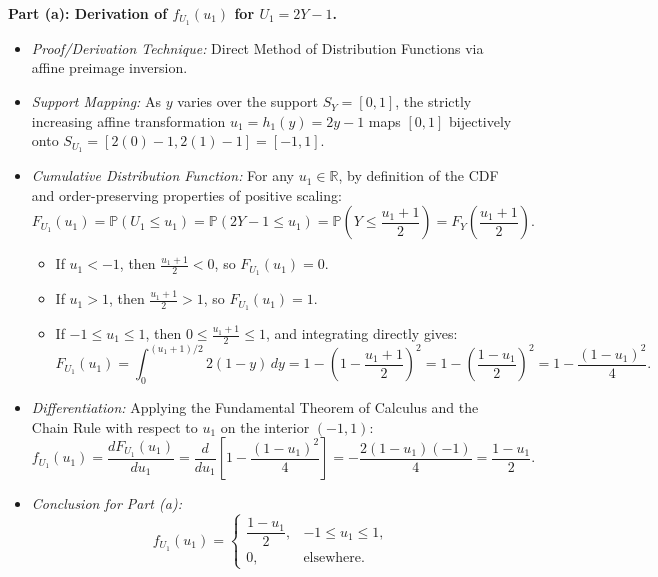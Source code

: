 \documentclass[11pt, letterpaper]{article}
\theoremstyle{definition}
\theoremstyle{remark}
\newcommand{\R}{\mathbb{R}}
\newcommand{\Prob}{\mathbb{P}}
\begin{document}
\textbf{Part (a): Derivation of $f_{U_1}(u_1)$ for $U_1 = 2Y - 1$.}
\begin{itemize}
    \item \textit{Proof/Derivation Technique:} Direct Method of Distribution Functions via affine preimage inversion.
    \item \textit{Support Mapping:} As $y$ varies over the support $S_Y = [0, 1]$, the strictly increasing affine transformation $u_1 = h_1(y) = 2y - 1$ maps $[0, 1]$ bijectively onto $S_{U_1} = [2(0)-1, 2(1)-1] = [-1, 1]$.
    \item \textit{Cumulative Distribution Function:} For any $u_1 \in \R$, by definition of the CDF and order-preserving properties of positive scaling:
    \[
        F_{U_1}(u_1) = \Prob(U_1 \le u_1) = \Prob(2Y - 1 \le u_1) = \Prob\left(Y \le \frac{u_1 + 1}{2}\right) = F_Y\left(\frac{u_1 + 1}{2}\right).
    \]
    \begin{itemize}
        \item If $u_1 < -1$, then $\frac{u_1 + 1}{2} < 0$, so $F_{U_1}(u_1) = 0$.
        \item If $u_1 > 1$, then $\frac{u_1 + 1}{2} > 1$, so $F_{U_1}(u_1) = 1$.
        \item If $-1 \le u_1 \le 1$, then $0 \le \frac{u_1 + 1}{2} \le 1$, and integrating directly gives:
        \[
            F_{U_1}(u_1) = \int_{0}^{(u_1 + 1)/2} 2(1 - y)\,dy = 1 - \left(1 - \frac{u_1 + 1}{2}\right)^2 = 1 - \left(\frac{1 - u_1}{2}\right)^2 = 1 - \frac{(1 - u_1)^2}{4}.
        \]
    \end{itemize}
    \item \textit{Differentiation:} Applying the Fundamental Theorem of Calculus and the Chain Rule with respect to $u_1$ on the interior $(-1, 1)$:
    \[
        f_{U_1}(u_1) = \frac{dF_{U_1}(u_1)}{du_1} = \frac{d}{du_1}\left[1 - \frac{(1 - u_1)^2}{4}\right] = -\frac{2(1 - u_1)(-1)}{4} = \frac{1 - u_1}{2}.
    \]
    \item \textit{Conclusion for Part (a):}
    \[
        f_{U_1}(u_1) = \begin{cases} \dfrac{1 - u_1}{2}, & -1 \le u_1 \le 1, \\[6pt] 0, & \text{elsewhere.} \end{cases}
    \]
\end{itemize}
\end{document}
